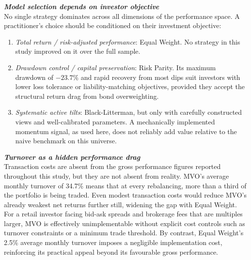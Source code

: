 \documentclass[a4paper,alpha-refs]{scr-contemporary}
\numberwithin{equation}{section}
\begin{document}
\noindent\textbf{\emph{Model selection depends on investor objective}} \\
\indent No single strategy dominates across all dimensions of the performance space. A
practitioner's choice should be conditioned on their investment objective:
\begin{enumerate}
    \item \textit{Total return / risk-adjusted performance}: Equal Weight. No strategy
    in this study improved on it over the full sample.
    \item \textit{Drawdown control / capital preservation}: Risk Parity. Its maximum
    drawdown of $-23.7\%$ and rapid recovery from most dips suit investors with lower
    loss tolerance or liability-matching objectives, provided they accept the structural
    return drag from bond overweighting.
    \item \textit{Systematic active tilts}: Black-Litterman, but only with carefully
    constructed views and well-calibrated parameters. A mechanically implemented
    momentum signal, as used here, does not reliably add value relative to the naive
    benchmark on this universe.
\end{enumerate}

\noindent\textbf{\emph{Turnover as a hidden performance drag}} \\
\indent Transaction costs are absent from the gross performance figures reported
throughout this study, but they are not absent from reality. MVO's average monthly
turnover of 34.7\% means that at every rebalancing, more than a third of the portfolio
is being traded. Even modest transaction costs would reduce MVO's already weakest
net returns further still, widening the gap with Equal Weight. \newline 
\indent For a retail investor
facing bid-ask spreads and brokerage fees that are multiples larger, MVO is effectively
unimplementable without explicit cost controls such as turnover constraints or a minimum
trade threshold. \newline 
\indent By contrast, Equal Weight's 2.5\% average monthly turnover imposes a
negligible implementation cost, reinforcing its practical appeal beyond its favourable
gross performance. \\
\end{document}
